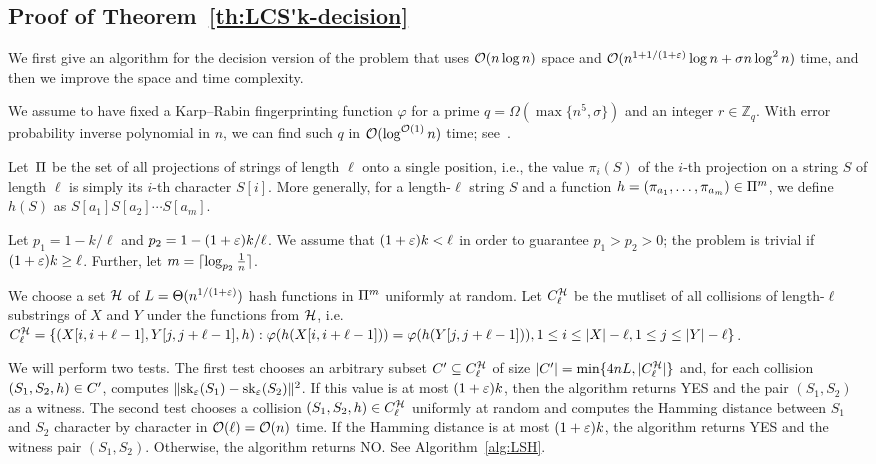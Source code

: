 \subsection{Proof of Theorem~\ref{th:LCS'k-decision}}\label{sec:decision}
We first give an algorithm for the decision version of the \kApproxLCS problem that uses $\mathcal{O}(n \log n)$ space and $\mathcal{O}(n^{1+1/(1+\varepsilon)} \log n + \sigma n \log^2 n)$ time, and then we improve the space and time complexity. 

We assume to have fixed a Karp--Rabin fingerprinting function $\varphi$ for a prime $q = \Omega(\max\{n^5, \sigma\})$ and an integer $r \in \mathbb{Z}_q$. With error probability inverse polynomial in $n$, we can find such $q$ in $\mathcal{O}(\log^{\mathcal{O}(1)}n)$ time;
see~\cite{DBLP:journals/moc/TaoCH12,agrawal2004primes}. 

Let~$\Pi$ be the set of all projections of strings of length $\ell$ onto a single position, i.e., the value $\pi_i(S)$ of the $i$-th projection on a string $S$ of length $\ell$ is simply its $i$-th character $S[i]$. More generally, for a length-$\ell$ string $S$ and a function $h=(\pi_{a_1},\ldots,\pi_{a_m}) \in \Pi^m$, we define $h(S)$ as $S[a_{1}] S[a_{2}] \cdots S[a_{m}]$.

Let $p_1 = 1 - k / \ell$ and $p_2 = 1 - (1+\varepsilon) k / \ell$. We assume that $(1+\varepsilon) k< \ell$ in order to guarantee $p_1>p_2>0$; the problem is trivial if $(1+\varepsilon)k \ge \ell$. 
Further, let $m = \lceil \log_{p_2}{\tfrac{1}{n}} \rceil$.

We choose a set $\mathcal{H}$ of $L = \Theta(n^{1/(1+\varepsilon)})$ hash functions in $\Pi^m$ uniformly at random. Let $C^{\mathcal{H}}_{\ell}$ be the mutliset of all collisions of length-$\ell$ substrings of $X$ and $Y$ under the functions from $\mathcal{H}$, i.e. $C^{\mathcal{H}}_{\ell} = \{(X[i,i+\ell-1], Y[j,j+\ell-1],h) : \varphi(h(X[i,i+\ell-1])) = \varphi(h(Y[j,j+\ell-1])), 1 \le i \le |X|-\ell, 1 \le j \le |Y|-\ell\}$. 

We will perform two tests. The first test chooses an arbitrary subset $C'\subseteq C^{\mathcal{H}}_{\ell}$ of size $|C'|=\min\{4nL, |C^{\mathcal{H}}_{\ell}|\}$ and, for each collision $(S_1, S_2, h)\in C'$, computes $\lVert\mathrm{sk}_\varepsilon(S_1) - \mathrm{sk}_\varepsilon (S_2)\rVert^2$. If this value is at most $(1+\varepsilon) k$, then the algorithm returns YES and the pair $(S_1, S_2)$ as a witness. The second test chooses a collision $(S_1, S_2, h) \in C^{\mathcal{H}}_{\ell}$ uniformly at random and computes the Hamming distance between $S_1$ and $S_2$ character by character in $\mathcal{O}(\ell) = \mathcal{O}(n)$ time. If the Hamming distance is at most $(1+\varepsilon)k$, the algorithm returns YES and the witness pair $(S_1, S_2)$. Otherwise, the algorithm returns NO. See Algorithm~\ref{alg:LSH}.

